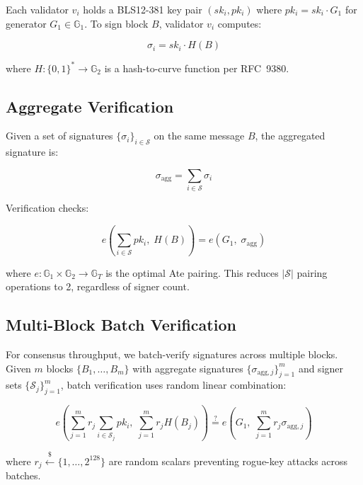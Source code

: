 \documentclass[11pt,letterpaper]{article}
\theoremstyle{definition}
\theoremstyle{remark}
\begin{document}
Each validator $v_i$ holds a BLS12-381 key pair $(sk_i, pk_i)$ where $pk_i = sk_i \cdot G_1$ for generator $G_1 \in \mathbb{G}_1$. To sign block $B$, validator $v_i$ computes:

\begin{equation}
\sigma_i = sk_i \cdot H(B)
\end{equation}

where $H: \{0,1\}^* \rightarrow \mathbb{G}_2$ is a hash-to-curve function per RFC~9380.

\subsection{Aggregate Verification}

Given a set of signatures $\{\sigma_i\}_{i \in \mathcal{S}}$ on the same message $B$, the aggregated signature is:

\begin{equation}
\sigma_{\text{agg}} = \sum_{i \in \mathcal{S}} \sigma_i
\end{equation}

Verification checks:

\begin{equation}
e\!\left(\sum_{i \in \mathcal{S}} pk_i,\; H(B)\right) = e(G_1,\; \sigma_{\text{agg}})
\end{equation}

where $e: \mathbb{G}_1 \times \mathbb{G}_2 \rightarrow \mathbb{G}_T$ is the optimal Ate pairing. This reduces $|\mathcal{S}|$ pairing operations to 2, regardless of signer count.

\subsection{Multi-Block Batch Verification}

For consensus throughput, we batch-verify signatures across multiple blocks. Given $m$ blocks $\{B_1, \ldots, B_m\}$ with aggregate signatures $\{\sigma_{\text{agg},j}\}_{j=1}^{m}$ and signer sets $\{\mathcal{S}_j\}_{j=1}^{m}$, batch verification uses random linear combination:

\begin{equation}
e\!\left(\sum_{j=1}^{m} r_j \sum_{i \in \mathcal{S}_j} pk_i,\; \sum_{j=1}^{m} r_j H(B_j)\right) \stackrel{?}{=} e\!\left(G_1,\; \sum_{j=1}^{m} r_j \sigma_{\text{agg},j}\right)
\end{equation}

where $r_j \xleftarrow{\$} \{1, \ldots, 2^{128}\}$ are random scalars preventing rogue-key attacks across batches.
\end{document}
